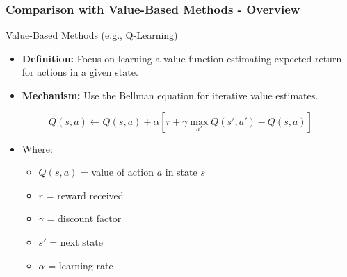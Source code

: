 \documentclass{beamer}
\begin{document}
\begin{frame}[fragile]
    \frametitle{Comparison with Value-Based Methods - Overview}
    \begin{block}{Value-Based Methods (e.g., Q-Learning)}
        \begin{itemize}
            \item \textbf{Definition:} Focus on learning a value function estimating expected return for actions in a given state.
            \item \textbf{Mechanism:} Use the Bellman equation for iterative value estimates.
        \end{itemize}
        \begin{equation}
            Q(s, a) \leftarrow Q(s, a) + \alpha \left[ r + \gamma \max_{a'} Q(s', a') - Q(s, a) \right]
        \end{equation}
        \begin{itemize}
            \item Where:
            \begin{itemize}
                \item \( Q(s, a) \) = value of action \( a \) in state \( s \)
                \item \( r \) = reward received
                \item \( \gamma \) = discount factor
                \item \( s' \) = next state
                \item \( \alpha \) = learning rate
            \end{itemize}
        \end{itemize}
    \end{block}
\end{frame}
\end{document}
